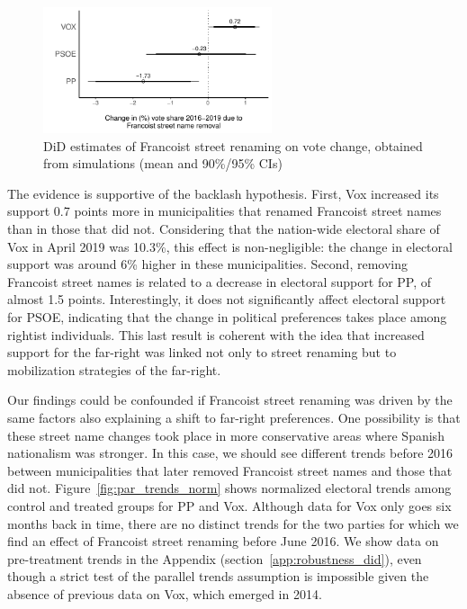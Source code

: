 \documentclass[12pt, titlepage]{article}
\begin{document}
\begin{figure}[htb!]
\centering

    \vspace{25pt}

  \includegraphics[width = 0.6\textwidth]{img/DiD_estimates}

  \caption{DiD estimates of Francoist street renaming on vote change, obtained from simulations (mean and 90\%/95\% CIs)}\label{fig:main_did}

\end{figure}

The evidence is supportive of the backlash hypothesis. First, Vox increased its support 0.7 points more in municipalities that renamed Francoist street names than in those that did not. Considering that the nation-wide electoral share of Vox in April 2019 was 10.3\%, this effect is non-negligible: the change in electoral support was around 6\% higher in these municipalities.
Second, removing Francoist street names is related to a decrease in electoral support for PP, of almost 1.5 points. Interestingly, it does not significantly affect electoral support for PSOE, indicating that the change in political preferences takes place among rightist individuals. This last result is coherent with the idea that increased support for the far-right was linked not only to street renaming but to mobilization strategies of the far-right.

Our findings could be confounded if Francoist street renaming was driven by the same factors also explaining a shift to far-right preferences.
One possibility is that these street name changes took place in more conservative areas where Spanish nationalism was stronger.
In this case, we should see different trends before 2016 between municipalities that later removed Francoist street names and those that did not.
Figure~\ref{fig:par_trends_norm} shows normalized electoral trends among control and treated groups for PP and Vox.
Although data for Vox only goes six months back in time, there are no distinct trends for the two parties for which we find an effect of Francoist street renaming before June 2016.
We show data on pre-treatment trends in the Appendix (section~\ref{app:robustness_did}), even though a strict test of the parallel trends assumption is impossible given the absence of previous data on Vox, which emerged in 2014.
\end{document}
